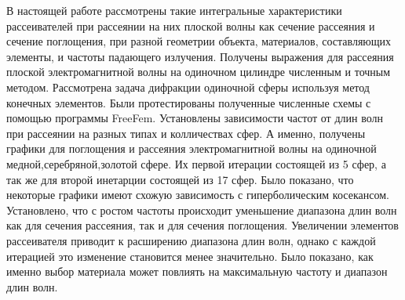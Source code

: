 \conclusion
В настоящей работе рассмотрены такие интегральные характеристики рассеивателей при рассеянии на них плоской волны как сечение рассеяния и сечение поглощения, при разной геометрии объекта, материалов, составляющих элементы, и частоты падающего излучения. Получены выражения для рассеяния плоской электромагнитной волны на одиночном цилиндре численным и точным методом. Рассмотрена задача дифракции одиночной сферы используя метод конечных элементов. Были протестированы полученные численные схемы с помощью программы FreeFem. Установлены зависимости частот от длин волн при рассеянии на разных типах и колличествах сфер. А именно, получены графики для поглощения и рассеяния электромагнитной волны на одиночной медной,серебряной,золотой сфере. Их первой итерации состоящей из 5 сфер, а так же для второй инетарции состоящей из 17 сфер. Было показано, что некоторые графики имеют схожую зависимость с гиперболическим косекансом. Установлено, что с ростом частоты происходит уменьшение диапазона длин волн как для сечения рассеяния, так и для сечения поглощения. Увеличении элементов рассеивателя приводит к расширению диапазона длин волн, однако с каждой итерацией это изменение становится менее значительно. Было показано, как именно выбор материала может повлиять на максимальную частоту и диапазон длин волн. 
